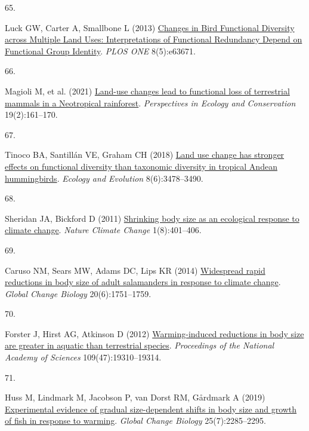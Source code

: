\documentclass{article}
\newlength{\cslhangindent}
\newlength{\csllabelwidth}
\newlength{\cslentryspacingunit} %
\newenvironment{CSLReferences}[2] %
 {%
  \setlength{\parindent}{0pt}
  \ifodd #1
  \let\oldpar\par
  \def\par{\hangindent=\cslhangindent\oldpar}
  \fi
  \setlength{\parskip}{#2\cslentryspacingunit}
 }%
 {}
\newcommand{\CSLLeftMargin}[1]{\parbox[t]{\csllabelwidth}{#1}}
\newcommand{\CSLRightInline}[1]{\parbox[t]{\linewidth - \csllabelwidth}{#1}\break}
\begin{document}
\begin{CSLReferences}{0}{0}
\leavevmode{}%
\CSLLeftMargin{65. }%
\CSLRightInline{Luck GW, Carter A, Smallbone L (2013)
\href{https://doi.org/10.1371/journal.pone.0063671}{Changes in Bird
Functional Diversity across Multiple Land Uses: Interpretations of
Functional Redundancy Depend on Functional Group Identity}. \emph{PLOS
ONE} 8(5):e63671.}

\leavevmode{}%
\CSLLeftMargin{66. }%
\CSLRightInline{Magioli M, et al. (2021)
\href{https://doi.org/10.1016/j.pecon.2021.02.006}{Land-use changes lead
to functional loss of terrestrial mammals in a Neotropical rainforest}.
\emph{Perspectives in Ecology and Conservation} 19(2):161--170.}

\leavevmode{}%
\CSLLeftMargin{67. }%
\CSLRightInline{Tinoco BA, Santillán VE, Graham CH (2018)
\href{https://doi.org/10.1002/ece3.3813}{Land use change has stronger
effects on functional diversity than taxonomic diversity in tropical
Andean hummingbirds}. \emph{Ecology and Evolution} 8(6):3478--3490.}

\leavevmode{}%
\CSLLeftMargin{68. }%
\CSLRightInline{Sheridan JA, Bickford D (2011)
\href{https://doi.org/10.1038/nclimate1259}{Shrinking body size as an
ecological response to climate change}. \emph{Nature Climate Change}
1(8):401--406.}

\leavevmode{}%
\CSLLeftMargin{69. }%
\CSLRightInline{Caruso NM, Sears MW, Adams DC, Lips KR (2014)
\href{https://doi.org/10.1111/gcb.12550}{Widespread rapid reductions in
body size of adult salamanders in response to climate change}.
\emph{Global Change Biology} 20(6):1751--1759.}

\leavevmode{}%
\CSLLeftMargin{70. }%
\CSLRightInline{Forster J, Hirst AG, Atkinson D (2012)
\href{https://doi.org/10.1073/pnas.1210460109}{Warming-induced
reductions in body size are greater in aquatic than terrestrial
species}. \emph{Proceedings of the National Academy of Sciences}
109(47):19310--19314.}

\leavevmode{}%
\CSLLeftMargin{71. }%
\CSLRightInline{Huss M, Lindmark M, Jacobson P, van Dorst RM, Gårdmark A
(2019) \href{https://doi.org/10.1111/gcb.14637}{Experimental evidence of
gradual size-dependent shifts in body size and growth of fish in
response to warming}. \emph{Global Change Biology} 25(7):2285--2295.}


\end{CSLReferences}
\end{document}
